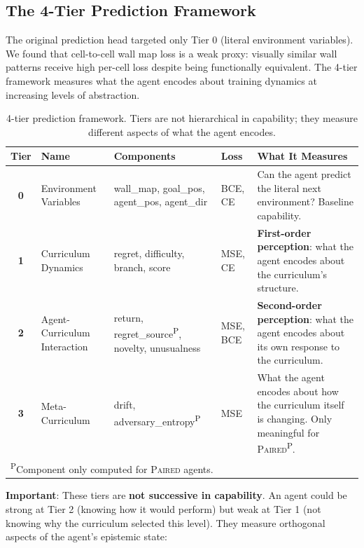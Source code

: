 \documentclass[11pt,a4paper]{article}
\theoremstyle{remark}
\newcommand{\paired}{\textsc{Paired}}
\begin{document}
\subsection{The 4-Tier Prediction Framework}

The original prediction head targeted only Tier 0 (literal environment variables). We found that cell-to-cell wall map loss is a weak proxy: visually similar wall patterns receive high per-cell loss despite being functionally equivalent. The 4-tier framework measures what the agent encodes about training dynamics at increasing levels of abstraction.

\begin{table}[H]
\centering
\caption{4-tier prediction framework. Tiers are not hierarchical in capability; they measure different aspects of what the agent encodes.}
\begin{tabularx}{\textwidth}{c >{\raggedright\arraybackslash}p{2.5cm} >{\raggedright\arraybackslash}p{3.5cm} >{\raggedright\arraybackslash}p{1.5cm} X}
\toprule
\textbf{Tier} & \textbf{Name} & \textbf{Components} & \textbf{Loss} & \textbf{What It Measures} \\
\midrule
\textbf{0} & Environment Variables & wall\_map, goal\_pos, agent\_pos, agent\_dir & BCE, CE & Can the agent predict the literal next environment? Baseline capability. \\
\addlinespace
\textbf{1} & Curriculum Dynamics & regret, difficulty, branch, score & MSE, CE & \textbf{First-order perception}: what the agent encodes about the curriculum's structure. \\
\addlinespace
\textbf{2} & Agent-Curriculum Interaction & return, regret\_source\textsuperscript{P}, novelty, unusualness & MSE, BCE & \textbf{Second-order perception}: what the agent encodes about its own response to the curriculum. \\
\addlinespace
\textbf{3} & Meta-Curriculum & drift, adversary\_entropy\textsuperscript{P} & MSE & What the agent encodes about how the curriculum itself is changing. Only meaningful for \paired{}\textsuperscript{P}. \\
\bottomrule
\multicolumn{5}{l}{\footnotesize \textsuperscript{P}Component only computed for \paired{} agents.}
\end{tabularx}
\end{table}

\textbf{Important}: These tiers are \textbf{not successive in capability}. An agent could be strong at Tier 2 (knowing how it would perform) but weak at Tier 1 (not knowing why the curriculum selected this level). They measure orthogonal aspects of the agent's epistemic state:
\end{document}
